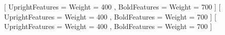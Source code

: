 ﻿%
\setmainfont{Noto Serif}      %
\setsansfont{Noto Sans}       %

\newjfontfamily{}[
  UprightFeatures = { Weight = 400 }, %
  BoldFeatures    = { Weight = 700 }  %
]
\newjfontfamily{}[
  UprightFeatures = { Weight = 400 }, %
  BoldFeatures    = { Weight = 700 }  %
]
\newjfontfamily{}[
  UprightFeatures = { Weight = 400 },
  BoldFeatures    = { Weight = 700 }
]